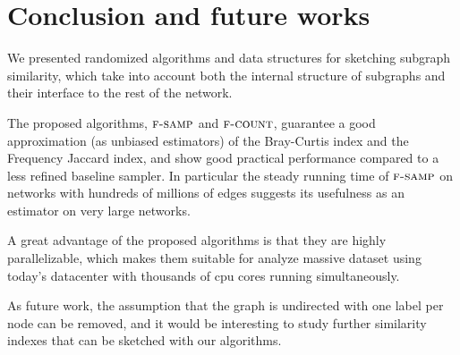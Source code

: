 \chapter{Conclusion and future works}
    

We presented randomized algorithms and data structures for sketching subgraph similarity, 
which take into account both the internal structure of subgraphs and their interface to the rest of the network. 

The proposed algorithms, $\textsc{f-samp}$ and $\textsc{f-count}$, guarantee a good approximation
(as unbiased estimators) of the Bray-Curtis index and the Frequency
Jaccard index, and show good practical performance compared to a
less refined baseline sampler. In particular the steady running time
of $\textsc{f-samp}$ on networks with hundreds of millions of edges suggests
its usefulness as an estimator on very large networks.

A great advantage of the proposed algorithms is that they are highly parallelizable,
which makes them suitable for analyze massive dataset using today's datacenter with 
thousands of cpu cores running simultaneously.

As future work, the assumption that the graph is undirected with one label per
node can be removed, and it would be interesting to study further
similarity indexes that can be sketched with our algorithms.